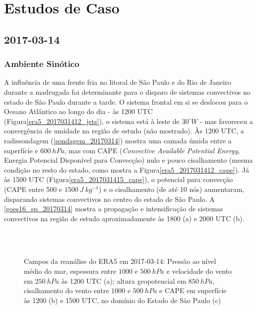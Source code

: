 \section{Estudos de Caso}\label{estudo_casos}

\subsection{2017-03-14}

\subsubsection{Ambiente Sinótico}\label{sinotica_201703014}

A influência de uma frente fria no litoral de São Paulo e do Rio de Janeiro durante a madrugada foi determinante para o disparo de sistemas convectivos no estado de São Paulo durante a tarde. O sistema frontal em si se deslocou para o Oceano Atlântico ao longo do dia - às 1200 UTC (Figura\autoref{era5_2017031412_jets}), o sistema está à leste de $30^{\circ}W$ - mas favoreceu a convergência de umidade na região de estudo (não mostrado). Às 1200 UTC, a radissondagem (\autoref{sondagem_20170314}) mostra uma camada úmida entre a superfície e $600\:hPa$, mas com CAPE (\textit{Convective Available Potential Energy}, Energia Potencial Disponível para Convecção) nulo e pouco cisalhamento (mesma condição no resto do estado, como mostra a Figura\autoref{era5_2017031412_cape}). Já às 1500 UTC (Figura\autoref{era5_2017031415_cape}), o potencial para convecção (CAPE entre 500 e $1500\:J\:kg^{-1}$) e o cisalhamento (de até 10 nós) aumentaram, disparando sistemas convectivos no centro do estado de São Paulo. A \autoref{goes16_sp_20170314} mostra a propagação e intensificação de sistemas convectivos na região de estudo aproximadamente às 1800 (a) e 2000 UTC (b).

\begin{figure}[htb]
	\begin{center}
		\caption{Campos da reanálise do ERA5 em 2017-03-14: Pressão ao nível médio do mar, espessura entre $1000$ e $500\:hPa$ e velocidade do vento em $250\:hPa$ às 1200 UTC (a); altura geopotencial em $850\:hPa$, cisalhamento do vento entre $1000$ e $500\:hPa$ e CAPE em superfície às 1200 (b) e 1500 UTC, no domínio do Estado de São Paulo (c)} 
		\label{era5_20170314_main}
		 \\
		 \\
	\end{center}
\end{figure}

